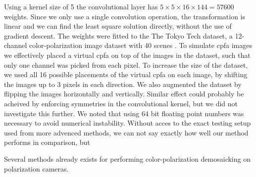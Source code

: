 Using a kernel size of 5 the convolutional layer has $5\times5\times16\times144=57600$ weights.
Since we only use a single convolution operation, the transformation is linear and we can find the least square solution directly, without the use of gradient descent.
The weights were fitted to the The Tokyo Tech dataset, a 12-channel color-polarization image dataset with 40 scenes \cite{morimatsuMonochromeColorPolarization2020}\cite{morimatsuMonochromeColorPolarization2021}.
To simulate \gls{cpfa} images we effectively placed a virtual \gls{cpfa} on top of the images in the dataset, such that only one channel was picked from each pixel.
To increase the size of the dataset, we used all 16 possible placements of the virtual \gls{cpfa} on each image, by shifting the images up to 3 pixels in each direction.
We also augmented the dataset by flipping the images horizontally and vertically.
Similar effect could probably be acheived by enforcing symmetries in the convolutional kernel, but we did not investigate this further.
We noted that using 64 bit floating point numbers was necessary to avoid numerical instability.
Without acces to the exact testing setup used from more advenced methods, we can not say exactly how well our method performs in comparison, but

Several methods already exists for performing color-polarization demosaicking on polarization cameras\cite{morimatsuMonochromeColorPolarization2020}\cite{morimatsuMonochromeColorPolarization2021}\cite{nguyenTwoStepColorPolarizationDemosaicking2022a}.





